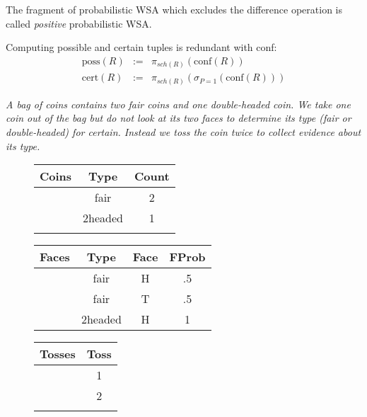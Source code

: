 The fragment of probabilistic WSA which excludes the difference operation is called
{\em positive}\/ probabilistic WSA.


Computing possible and certain tuples is redundant with conf:
\begin{eqnarray*}
\mbox{poss}(R) &:=& 
\pi_{sch(R)}(\mbox{conf}(R))
\\
\mbox{cert}(R) &:=& \pi_{sch(R)}(\sigma_{P=1}(\mbox{conf}(R)))
\end{eqnarray*}



\begin{example}\em
\label{ex:twotosses}
A bag of coins contains two fair coins and one double-headed coin. We take one coin out of the bag but do not look at its two faces to determine its type (fair or double-headed) for certain. Instead we toss the coin twice to collect evidence about its type.


\begin{figure}
\begin{center}
\begin{tabular}{@{~}c|c@{~}c@{~}}
\hline
Coins & Type & Count \\
\hline
 & fair         & 2 \\
 & 2headed & 1 \\
\\
\end{tabular}
\hspace{2mm}
\begin{tabular}{@{~}c|ccc@{~}}
\hline
Faces & Type & Face & FProb \\
\hline
 & fair    & H & .5 \\
 & fair    & T & .5 \\
 & 2headed & H &  1 \\
\end{tabular}
\hspace{2mm}
\begin{tabular}{@{~}c|c@{~}}
\hline
Tosses & Toss \\
\hline
 & 1 \\
 & 2 \\
\\
\end{tabular}

\medskip


\end{center}
\end{figure}
\end{example}
